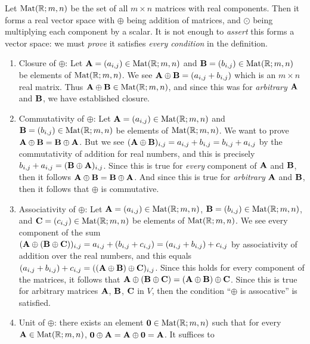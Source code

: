 \begin{example}
Let $\mathrm{Mat}(\mathbb{R};m,n)$ be the set of all $m\times n$ matrices with real components.
Then it forms a real vector space with $\oplus$ being addition of
matrices, and $\odot$ being multiplying each component by a scalar.
It is not enough to \emph{assert} this forms a vector space: we must
\emph{prove} it satisfies \emph{every condition} in the definition.
\begin{enumerate}[label=(\arabic*)]
\item Closure of $\oplus$: Let $\mathbf{A}=(a_{i,j})\in\mathrm{Mat}(\mathbb{R};m,n)$ and
  $\mathbf{B}=(b_{i,j})\in\mathrm{Mat}(\mathbb{R};m,n)$ be elements of $\mathrm{Mat}(\mathbb{R};m,n)$.
  We see $\mathbf{A}\oplus\mathbf{B}=(a_{i,j}+b_{i,j})$ which is an $m\times n$ 
  real matrix. Thus $\mathbf{A}\oplus\mathbf{B}\in\mathrm{Mat}(\mathbb{R};m,n)$, and since
  this was for \emph{arbitrary} $\mathbf{A}$ and $\mathbf{B}$, we have
  established closure.
\item Commutativity of $\oplus$: Let $\mathbf{A}=(a_{i,j})\in\mathrm{Mat}(\mathbb{R};m,n)$ and
  $\mathbf{B}=(b_{i,j})\in\mathrm{Mat}(\mathbb{R};m,n)$ be elements of $\mathrm{Mat}(\mathbb{R};m,n)$.
  We want to prove $\mathbf{A}\oplus\mathbf{B}=\mathbf{B}\oplus\mathbf{A}$.
  But we see $(\mathbf{A}\oplus\mathbf{B})_{i,j} = a_{i,j}+b_{i,j} = b_{i,j}+a_{i,j}$
  by the commutativity of addition for real numbers, and this is
  precisely
  $b_{i,j}+a_{i,j} = (\mathbf{B}\oplus\mathbf{A})_{i,j}$. Since this is true
  for \emph{every} component of $\mathbf{A}$ and $\mathbf{B}$, then it follows
  $\mathbf{A}\oplus\mathbf{B}=\mathbf{B}\oplus\mathbf{A}$. 
  And since this is true for \emph{arbitrary} $\mathbf{A}$ and
  $\mathbf{B}$, then it follows that $\oplus$ is commutative. 
\item Associativity of $\oplus$:
Let $\mathbf{A}=(a_{i,j})\in\mathrm{Mat}(\mathbb{R};m,n)$,
  $\mathbf{B}=(b_{i,j})\in\mathrm{Mat}(\mathbb{R};m,n)$, and
  $\mathbf{C}=(c_{i,j})\in\mathrm{Mat}(\mathbb{R};m,n)$ be elements of $\mathrm{Mat}(\mathbb{R};m,n)$.
  We see every component of the sum $(\mathbf{A}\oplus(\mathbf{B}\oplus\mathbf{C}))_{i,j} = a_{i,j} + (b_{i,j}+c_{i,j}) = (a_{i,j} + b_{i,j})+c_{i,j}$
  by associativity of addition over the real numbers,
  and this equals $(a_{i,j} + b_{i,j})+c_{i,j} = ((\mathbf{A}\oplus\mathbf{B})\oplus\mathbf{C})_{i,j}$.
  Since this holds for every component of the matrices, it follows that
  $\mathbf{A}\oplus(\mathbf{B}\oplus\mathbf{C}) = (\mathbf{A}\oplus\mathbf{B})\oplus\mathbf{C}$.
  Since this is true for arbitrary matrices $\mathbf{A}$, $\mathbf{B}$,
  $\mathbf{C}$ in $V$, then the condition ``$\oplus$ is assocative'' is satisfied.
\item Unit of $\oplus$: there exists an element $\mathbf{0}\in\mathrm{Mat}(\mathbb{R};m,n)$ such that
  for every $\mathbf{A}\in\mathrm{Mat}(\mathbb{R};m,n)$,
  $\mathbf{0}\oplus\mathbf{A}=\mathbf{A}\oplus\mathbf{0}=\mathbf{A}$. It suffices to

\end{enumerate}
\end{example}
